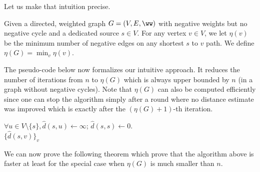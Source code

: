 Let us make that intuition precise.

\begin{definition}
Given a directed, weighted graph $G=(V,E,\ww)$ with negative weights but no negative cycle and a dedicated source $s \in V$. For any vertex $v \in V$, we let $\eta(v)$ be the minimum number of negative edges on any shortest $s$ to $v$ path. We define $\eta(G) = \min_v \eta(v)$. 
\end{definition}

The pseudo-code below now formalizes our intuitive approach. It reduces the number of iterations from $n$ to $\eta(G)$ which is always upper bounded by $n$ (in a graph without negative cycles). Note that $\eta(G)$ can also be computed efficiently since one can stop the algorithm simply after a round where no distance estimate was improved which is exactly after the $(\eta(G) +1)$-th iteration. 

\begin{algorithm}
$\forall u \in V \setminus \{s\}, \hat{d}(s, u) \gets \infty$; $\hat{d}(s,s) \gets 0$.\\
\Return $\{\hat{d}(s, v) \}_v$
\caption{$\textsc{BellmanFord}(G,s)$}
\label{alg:embellishedBellmanFord}
\end{algorithm}

We can now prove the following theorem which prove that the algorithm above is faster at least for the special case when $\eta(G)$ is much smaller than $n$.

